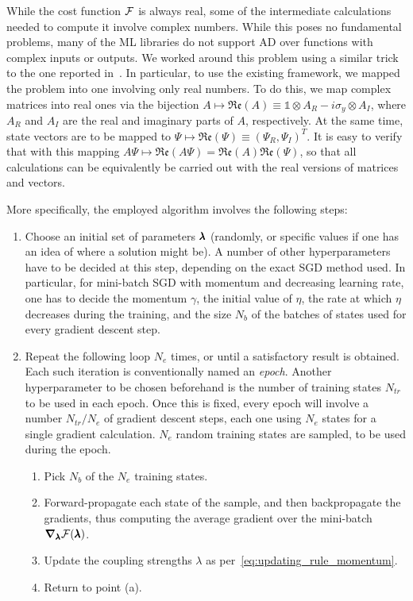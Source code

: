 While the cost function $\mathcal{F}$ is always real, some of the intermediate calculations needed to compute it involve complex numbers.
While this poses no fundamental problems, many of the \ac{ML} libraries do not support \ac{AD} over functions with complex inputs or outputs.
We worked around this problem using a similar trick to the one reported in~\cite{leung2017speedup}.
In particular, to use the existing framework, we mapped the problem into one involving only real numbers.
To do this, we map complex matrices into real ones via the bijection
$A\mapsto\mathfrak{Re}(A)\equiv\mathds1\otimes A_{R} - i \sigma_y\otimes A_{I}$,
where $A_R$ and $A_I$ are the real and imaginary parts of $A$, respectively.
At the same time, state vectors are to be mapped to
$\Psi\mapsto\mathfrak{Re}(\Psi)\equiv(\Psi_R, \Psi_I)^T$.
It is easy to verify that with this mapping
$A\Psi\mapsto\mathfrak{Re}(A\Psi)=\mathfrak{Re}(A)\mathfrak{Re}(\Psi)$,
so that all calculations can be equivalently be carried out with the real versions of matrices and vectors.

More specifically, the employed algorithm involves the following steps:
\begin{enumerate}
	\item Choose an initial set of parameters $\pmb{\lambda}$ (randomly, or specific values if one has an idea of where a solution might be).
	A number of other hyperparameters have to be decided at this step, depending on the exact \ac{SGD} method used. In particular, for mini-batch \ac{SGD} with momentum and decreasing learning rate, one has to decide the momentum $\gamma$, the initial value of $\eta$, the rate at which $\eta$ decreases during the training, and the size $N_b$ of the batches of states used for every gradient descent step.
	\item Repeat the following loop $N_e$ times, or until a satisfactory result is obtained.
	Each such iteration is conventionally named an \emph{epoch}.
	Another hyperparameter to be chosen beforehand is the number of training states $N_{tr}$ to be used in each epoch.
	Once this is fixed, every epoch will involve a number $N_{tr}/N_e$ of gradient descent steps, each one using $N_e$ states for a single gradient calculation.
	$N_e$ random training states are sampled, to be used during the epoch.
	\begin{enumerate}
		\item Pick $N_b$ of the $N_e$ training states.
		\item Forward-propagate each state of the sample, and then backpropagate the gradients, thus computing the average gradient over the mini-batch $\grad_{\pmb{\lambda}} \mathcal{F}(\pmb{\lambda})$.
		\item Update the coupling strengths $\lambda$ as per~\cref{eq:updating_rule_momentum}.
		\item Return to point (a).
	\end{enumerate}
\end{enumerate}

